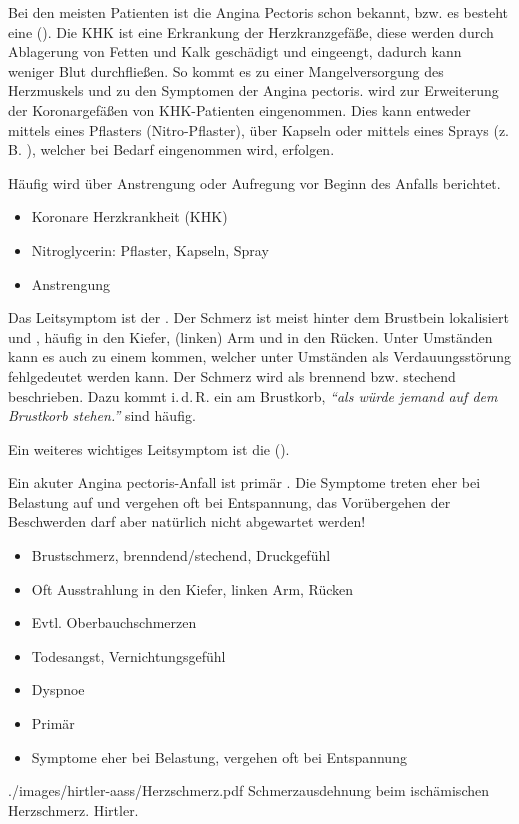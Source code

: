 { Bei den meisten Patienten ist die Angina
Pectoris schon bekannt, bzw. es besteht eine  (). Die KHK ist eine Erkrankung der
Herzkranzgefäße, diese werden durch Ablagerung von Fetten
und Kalk geschädigt und eingeengt, dadurch kann weniger Blut
durchfließen. So kommt es zu einer Mangelversorgung des
Herzmuskels und zu den Symptomen der Angina pectoris.
  wird zur Erweiterung der
Koronargefäßen von KHK-Patienten eingenommen. Dies kann
entweder mittels eines Pflasters (Nitro-Pflaster), über
Kapseln oder mittels eines Sprays (z.\,B.
), welcher bei Bedarf
eingenommen wird, erfolgen. 

 Häufig wird über Anstrengung oder Aufregung vor
Beginn des Anfalls berichtet. 

}
{
\begin{itemize}
  \item[\KAMEL{K}] Koronare Herzkrankheit (KHK)
  \item[\KAMEL{M}] Nitroglycerin: Pflaster, Kapseln, Spray
  \item[\KAMEL{E}] Anstrengung
\end{itemize}
}
{}
{}
{}



{%
Das Leitsymptom ist der . Der Schmerz ist meist hinter dem Brustbein
lokalisiert und , häufig in den
Kiefer, (linken) Arm und in den Rücken. Unter Umständen
kann es auch zu einem  kommen,
welcher unter Umständen als Verdauungsstörung fehlgedeutet
werden kann. Der Schmerz wird als brennend bzw. stechend
beschrieben. Dazu kommt i.\,d.\,R. ein  am Brustkorb, \emph{\enquote{als würde jemand auf dem Brustkorb stehen.}}  sind häufig.

Ein weiteres wichtiges Leitsymptom ist die 
().

Ein akuter Angina pectoris-Anfall ist primär . Die Symptome
treten eher bei Belastung auf und vergehen oft bei
Entspannung, das Vorübergehen der Beschwerden darf aber
natürlich nicht abgewartet werden!
}{
\begin{itemize}
  \item Brustschmerz, brenndend/stechend, Druckgefühl
  \item Oft Ausstrahlung in den Kiefer,
  linken Arm, Rücken
  \item Evtl. Oberbauchschmerzen
  \item Todesangst, Vernichtungsgefühl
  \item Dyspnoe
  \item Primär 
  \item Symptome eher bei Belastung, vergehen oft bei Entspannung
\end{itemize}

}
{./images/hirtler-aass/Herzschmerz.pdf}
{Schmerzausdehnung beim ischämischen
Herzschmerz.}
{Hirtler.}




